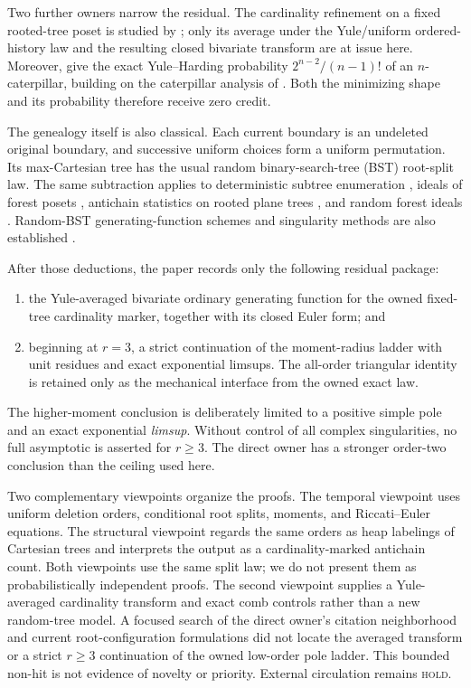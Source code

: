 \documentclass[10pt,a4paper]{amsart}
\theoremstyle{definition}
\theoremstyle{remark}
\begin{document}
Two further owners narrow the residual.  The cardinality refinement on a
fixed rooted-tree poset is studied by
\citet{AndriantianaWagnerWang2013}; only its average under the Yule/uniform
ordered-history law and the resulting closed bivariate transform are at
issue here.  Moreover, \citet[Table~1]{ChangFuchs2010} give the exact
Yule--Harding probability $2^{n-2}/(n-1)!$ of an $n$-caterpillar, building on
the caterpillar analysis of \citet{Rosenberg2006}.  Both the minimizing shape
and its probability therefore receive zero credit.

The genealogy itself is also classical.  Each current boundary is an
undeleted original boundary, and successive uniform choices form a uniform
permutation.  Its max-Cartesian tree has the usual random binary-search-tree
(BST) root-split law.  The same subtraction applies to deterministic subtree enumeration
\cite{Ruskey1981Subtrees}, ideals of forest posets
\cite{KodaRuskey1993Ideals}, antichain statistics on rooted plane trees
\cite{Klazar1997Twelve}, and random forest ideals
\cite{Janson2002Ideals}.  Random-BST generating-function schemes and
singularity methods are also established
\cite{FlajoletGourdonMartinez1997Patterns,MartinezPanholzerProdinger1998Descendants,FlajoletSedgewick2009}.

After those deductions, the paper records only the following residual
package:
\begin{enumerate}[label=\textup{(\roman*)}]
\item the Yule-averaged bivariate ordinary generating function for the
      owned fixed-tree cardinality marker, together with its closed Euler
      form; and
\item beginning at $r=3$, a strict continuation of the moment-radius ladder
      with unit residues and exact exponential limsups.  The all-order
      triangular identity is retained only as the mechanical interface from
      the owned exact law.
\end{enumerate}
The higher-moment conclusion is deliberately limited to a positive simple
pole and an exact exponential \emph{limsup}.  Without control of all complex
singularities, no full asymptotic is asserted for $r\geq3$.  The direct owner
has a stronger order-two conclusion than the ceiling used here.

Two complementary viewpoints organize the proofs.  The temporal viewpoint
uses uniform deletion orders, conditional root splits, moments, and
Riccati--Euler equations.  The structural viewpoint regards the same orders
as heap labelings of Cartesian trees and interprets the output as a
cardinality-marked antichain count.  Both viewpoints use the same split law;
we do not present them as probabilistically independent proofs.  The second
viewpoint supplies a Yule-averaged cardinality transform and exact comb
controls rather than a new random-tree model.  A focused search of the direct owner's
citation neighborhood and current root-configuration formulations did not
locate the averaged transform or a strict $r\geq3$ continuation of the owned
low-order pole ladder.  This bounded non-hit
is not evidence of novelty or priority.
External circulation remains \textsc{hold}.
\end{document}
